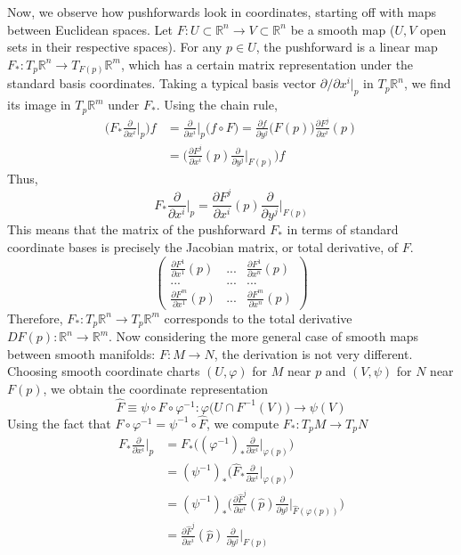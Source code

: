 \documentclass{article}
\theoremstyle{remark}
\theoremstyle{definition}
\begin{document}
Now, we observe how pushforwards look in coordinates, starting off with maps between Euclidean spaces. Let $F: U \subset \mathbb{R}^n \longrightarrow V \subset \mathbb{R}^n$ be a smooth map ($U, V$ open sets in their respective spaces). For any $p \in U$, the pushforward is a linear map $F_* : T_p \mathbb{R}^n \longrightarrow T_{F(p)} \mathbb{R}^m$, which has a certain matrix representation under the standard basis coordinates. Taking a typical basis vector $\partial/\partial x^i \big|_p$ in $T_p \mathbb{R}^n$, we find its image in $T_p \mathbb{R}^m$ under $F_*$. Using the chain rule, 
\begin{align*}
    \bigg( F_* \frac{\partial}{\partial x^i} \bigg|_p \bigg) f & = \frac{\partial}{\partial x^i} \bigg|_p \big( f \circ F \big) = \frac{\partial f}{\partial y^j} \big( F(p)\big) \frac{\partial F^j}{\partial x^i} (p) \\
    & = \bigg( \frac{\partial F^j}{\partial x^i} (p) \frac{\partial}{\partial y^j} \bigg|_{F(p)} \bigg) f 
\end{align*}
Thus, 
\[F_* \frac{\partial}{\partial x^i} \bigg|_p = \frac{\partial F^j}{\partial x^i} (p) \frac{\partial}{\partial y^j} \bigg|_{F(p)}\]
This means that the matrix of the pushforward $F_*$ in terms of standard coordinate bases is precisely the Jacobian matrix, or total derivative, of $F$. 
\[\begin{pmatrix}
\frac{\partial F^1}{\partial x^1} (p) & ... & \frac{\partial F^1}{\partial x^n} (p) \\
... & ... & ... \\
\frac{\partial F^m}{\partial x^1} (p) & ... & \frac{\partial F^m}{\partial x^n} (p) 
\end{pmatrix}\]
Therefore, $F_*: T_p \mathbb{R}^n \longrightarrow T_p \mathbb{R}^m$ corresponds to the total derivative $D F (p): \mathbb{R}^n \longrightarrow \mathbb{R}^m$. Now considering the more general case of smooth maps between smooth manifolds: $F: M \longrightarrow N$, the derivation is not very different. Choosing smooth coordinate charts $(U, \varphi)$ for $M$ near $p$ and $(V, \psi)$ for $N$ near $F(p)$, we obtain the coordinate representation 
\[\hat{F} \equiv \psi \circ F \circ \varphi^{-1}: \varphi \big( U \cap F^{-1} (V) \big) \longrightarrow \psi (V)\]
Using the fact that $F \circ \varphi^{-1} = \psi^{-1} \circ \hat{F}$, we compute $F_*: T_p M \longrightarrow T_p N$
\begin{align*}
    F_* \frac{\partial}{\partial x^i} \bigg|_p & = F_* \bigg( ( \varphi^{-1} )_* \frac{\partial}{\partial x^i} \bigg|_{\varphi(p)} \bigg) \\
    & = (\psi^{-1})_* \bigg( \hat{F}_* \frac{\partial}{\partial x^i} \bigg|_{\varphi(p)}\bigg) \\ 
    & = (\psi^{-1})_* \bigg( \frac{\partial \hat{F}^j}{\partial x^i} (\hat{p}) \frac{\partial}{\partial y^j} \bigg|_{\hat{F}(\varphi(p))} \bigg) \\
    & = \frac{\partial \hat{F}^j}{\partial x^i} (\hat{p})\, \frac{\partial}{\partial y^j} \bigg|_{F(p)} 
\end{align*}
\end{document}
